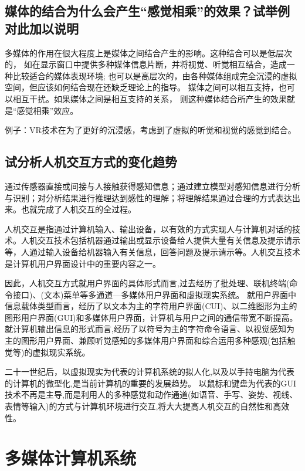 \documentclass[UTF8,a4paper,AutoFakeBold,AutoFakeSlant]{ctexart}
\begin{document}
\subsection{媒体的结合为什么会产生“感觉相乘”的效果？试举例对此加以说明}
多媒体的作用在很大程度上是媒体之间结合产生的影响。这种结合可以是低层次的，
如在显示窗口中提供多种媒体信息片断，并将视觉、听觉相互结合，造成一种比较适合的媒体表现环境;
也可以是高层次的，由各种媒体组成完全沉浸的虚拟空间，但应该如何结合现在还缺乏理论上的指导。
媒体之间可以相互支持，也可以相互干扰。如果媒体之间是相互支持的关系，
则这种媒体结合所产生的效果就是“感觉相乘”效应。

例子：VR技术在为了更好的沉浸感，考虑到了虚拟的听觉和视觉的感觉到结合。



\subsection{试分析人机交互方式的变化趋势}
通过传感器直接或间接与人接触获得感知信息；通过建立模型对感知信息进行分析与识别；对分析结果进行推理达到感性的理解；将理解结果通过合理的方式表达出来。也就完成了人机交互的全过程。

人机交互是指通过计算机输入、输出设备，以有效的方式实现人与计算机对话的技术。人机交互技术包括机器通过输出或显示设备给人提供大量有关信息及提示请示等，人通过输入设备给机器输入有关信息，回答问题及提示请示等。人机交互技术是计算机用户界面设计中的重要内容之一。

因此，人机交互方式就用户界面的具体形式而言,过去经历了批处理、联机终端(命令接口)、(文本)菜单等多通道—多媒体用户界面和虚拟现实系统。
就用户界面中信息载体类型而言，经历了以文本为主的字符用户界面(CUI)、以二维图形为主的图形用户界面(GUI)和多媒体用户界面，计算机与用户之间的通信带宽不断提高。
就计算机输出信息的形式而言,经历了以符号为主的字符命令语言、以视觉感知为主的图形用户界面、兼顾听觉感知的多媒体用户界面和综合运用多种感观(包括触觉等)的虚拟现实系统。

二十一世纪后，以虚拟现实为代表的计算机系统的拟人化,以及以手持电脑为代表的计算机的微型化,是当前计算机的重要的发展趋势。
以鼠标和键盘为代表的GUI技术不再是主导,而是利用人的多种感觉和动作通道(如语音、手写、姿势、视线、表情等输入)的方式与计算机环境进行交互,将大大提高人机交互的自然性和高效性。






\section{多媒体计算机系统}
\end{document}
